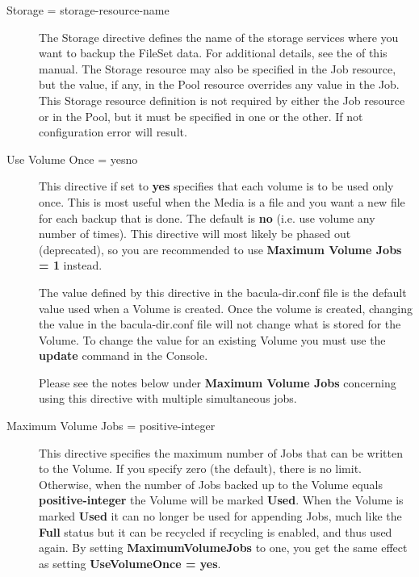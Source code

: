 \begin{description}
\item [Storage = \lt{}storage-resource-name\gt{}]
   The Storage directive defines the name of the storage services where you
   want to backup the FileSet data.  For additional details, see the
    of this manual.
   The Storage resource may also be specified in the Job resource,
   but the value, if any, in the Pool resource overrides any value
   in the Job. This Storage resource definition is not required by either
   the Job resource or in the Pool, but it must be specified in
   one or the other.  If not configuration error will result.

\item [Use Volume Once = \lt{}yes\vb{}no\gt{}]
   This directive if set to {\bf yes} specifies that each volume is to be
   used only once.  This is most useful when the Media is a file and you
   want a new file for each backup that is done.  The default is {\bf no}
   (i.e.  use volume any number of times).  This directive will most likely
   be phased out (deprecated), so you are recommended to use {\bf Maximum
   Volume Jobs = 1} instead.

   The value defined by this directive in the bacula-dir.conf file is the
   default value used when a Volume is created.  Once the volume is
   created, changing the value in the bacula-dir.conf file will not change
   what is stored for the Volume.  To change the value for an existing
   Volume you must use the {\bf update} command in the Console.

   Please see the notes below under {\bf Maximum Volume Jobs} concerning
   using this directive with multiple simultaneous jobs.

\item [Maximum Volume Jobs = \lt{}positive-integer\gt{}]
   This directive specifies the maximum number of Jobs that can be written
   to the Volume.  If you specify zero (the default), there is no limit.
   Otherwise, when the number of Jobs backed up to the Volume equals {\bf
   positive-integer} the Volume will be marked {\bf Used}.  When the Volume
   is marked {\bf Used} it can no longer be used for appending Jobs, much
   like the {\bf Full} status but it can be recycled if recycling is
   enabled, and thus used again.  By setting {\bf MaximumVolumeJobs} to
   one, you get the same effect as setting {\bf UseVolumeOnce = yes}.


\end{description}
